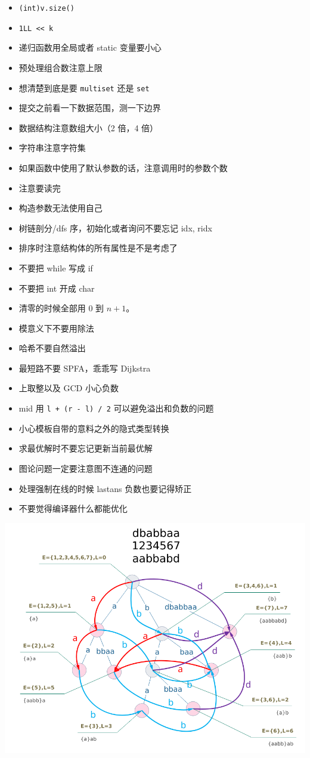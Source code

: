 \documentclass[9pt]{ctexart}
\begin{document}
\begin{multicols}{2}
  \begin{itemize}
    \item \verb|(int)v.size()|
    \item \verb|1LL << k|
    \item 递归函数用全局或者 static 变量要小心
    \item 预处理组合数注意上限
    \item 想清楚到底是要 \verb|multiset| 还是 \verb|set|
    \item 提交之前看一下数据范围，测一下边界
    \item 数据结构注意数组大小（2 倍，4 倍）
    \item 字符串注意字符集
    \item 如果函数中使用了默认参数的话，注意调用时的参数个数
    \item 注意要读完
    \item 构造参数无法使用自己
    \item 树链剖分/dfs 序，初始化或者询问不要忘记 idx, ridx
    \item 排序时注意结构体的所有属性是不是考虑了
    \item 不要把 while 写成 if
    \item 不要把 int 开成 char
    \item 清零的时候全部用 0 到 $n+1$。
    \item 模意义下不要用除法
    \item 哈希不要自然溢出
    \item 最短路不要 SPFA，乖乖写 Dijkstra
    \item 上取整以及 GCD 小心负数
    \item mid 用 \verb|l + (r - l) / 2| 可以避免溢出和负数的问题
    \item 小心模板自带的意料之外的隐式类型转换
    \item 求最优解时不要忘记更新当前最优解
    \item 图论问题一定要注意图不连通的问题
    \item 处理强制在线的时候 lastans 负数也要记得矫正
    \item 不要觉得编译器什么都能优化
  \end{itemize}

\end{multicols}

\begin{center}
  \includegraphics[width=0.8\linewidth]{assets/sam.png}
\end{center}
\end{document}
